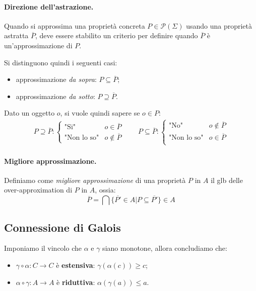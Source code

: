 \documentclass[a4paper, 11pt]{article}
\newcommand{\parts}[1]{\mathcal{P}(#1)}
\begin{document}
	\paragraph{Direzione dell'astrazione.}
	Quando si approssima una proprietà concreta $P \in \parts{\Sigma}$ usando una proprietà astratta $\overline{P}$, deve essere stabilito un criterio per definire quando $\overline{P}$ è un'approssimazione di $P$.
	
	Si distinguono quindi i seguenti casi:
	\begin{itemize}
		\item approssimazione \textit{da sopra}: $P \subseteq \overline{P}$;
		\item approssimazione \textit{da sotto}: $P \supseteq \overline{P}$.
	\end{itemize}
	
	Dato un oggetto $o$, si vuole quindi sapere se $o \in P$:
	\begin{align*}
		P \supseteq \overline{P}: \begin{cases}
			\text{"Si"} &o \in \overline{P} \\
			\text{"Non lo so"} &o \notin  \overline{P}
		\end{cases} \qquad
		P \subseteq \overline{P}: \begin{cases}
		\text{"No"} &o \notin \overline{P} \\
		\text{"Non lo so"} &o \in \overline{P}\\
		\end{cases}
	\end{align*} 
	
	\paragraph{Migliore approssimazione.}
	Definiamo come \textit{migliore approssimazione} di una proprietà $P$ in $A$ il glb delle over-approximation di $P$ in $A$, ossia: \[  \overline{P} = \bigcap \lbrace \overline{P'} \in A | P \subseteq \overline{P'} \rbrace \in A \]
	
	\subsection{Connessione di Galois}
	Imponiamo il vincolo che $\alpha$ e $\gamma$ siano monotone, allora concludiamo che: \begin{itemize}
		\item $\gamma \circ \alpha: C \to C$ è \textbf{estensiva}: $\gamma(\alpha(c)) \geq c$;
		\item $\alpha \circ \gamma : A \to A$ è \textbf{riduttiva}: $\alpha(\gamma(a)) \leq a$.
	\end{itemize}
\end{document}
